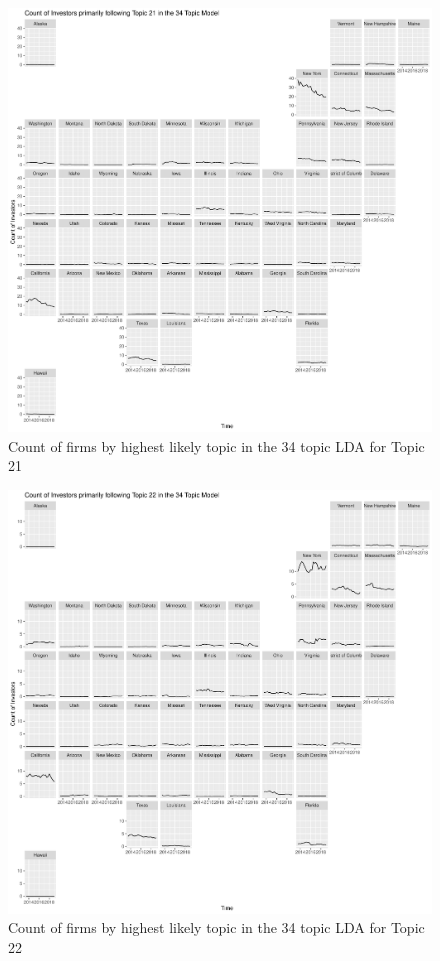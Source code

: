 \begin{figure}
	\centering
	\includegraphics[width=1\linewidth]{Figures/ChapterV/USA_34_Topic21.pdf}
	\caption[Count of Firms for Topic 21 by Quarter]{Count of firms by highest likely topic in the 34 topic LDA for Topic 21}
	\label{fig:StateLDA21}
\end{figure}

\begin{figure}
	\centering
	\includegraphics[width=1\linewidth]{Figures/ChapterV/USA_34_Topic22.pdf}
	\caption[Count of Firms for Topic 22 by Quarter]{Count of firms by highest likely topic in the 34 topic LDA for Topic 22}
	\label{fig:StateLDA22}
\end{figure}

